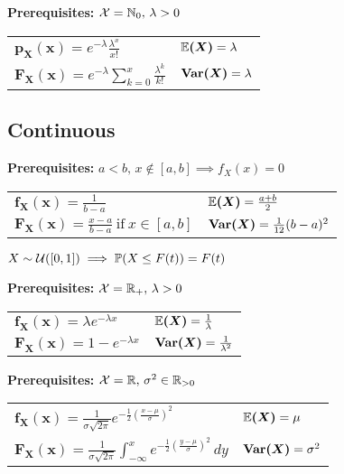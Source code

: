 \begin{ddefinition*}
  \textbf{Prerequisites:} \(\operatorname{\mathcal{X}} = \mathbb{N}_0, \, \lambda > 0\) \\
  \begin{tabularx}{\linewidth}{@{}ll@{}}
    \(\bm{p_X(x)} = e^{-\lambda}\frac{\lambda^x}{x!}\) & \(\bm{\mathbb{E}(X)} = \lambda\) \\
    \(\bm{F_X(x)} = e^{-\lambda} \sum\limits_{k=0}^x \frac{\lambda^k}{k!}\) & \(\bm{\Var(X)} = \lambda\)
  \end{tabularx}
\end{ddefinition*}

\pagebreak
\subsection*{Continuous}
\begin{cdefinition*}
  \textbf{Prerequisites:} \(a < b, \, x \notin [a, b] \implies f_X(x) = 0\) \\
  \begin{tabularx}{\linewidth}{@{}ll@{}}
    \(\bm{f_X(x)} = \frac{1}{b-a}\) & \(\bm{\mathbb{E}(X)} = \frac{a + b}{2}\) \\
    \(\bm{F_X(x)} = \frac{x - a}{b - a} \ \text{if} \ x \in [a, b]\) & \(\bm{\Var(X)} = \frac{1}{12}(b - a)^2\)
  \end{tabularx}
\end{cdefinition*}

\begin{lemma}
  \(X \sim \operatorname{\mathcal{U}}([0, 1]) \implies \mathbb{P}(X \leq F(t)) = F(t)\)
\end{lemma}

\begin{cdefinition*}
  \textbf{Prerequisites:} \(\operatorname{\mathcal{X}} = \mathbb{R}_+, \, \lambda > 0\) \\
  \begin{tabularx}{\linewidth}{@{}ll@{}}
    \(\bm{f_X(x)} = \lambda e^{-\lambda x}\) & \(\bm{\mathbb{E}(X)} = \frac{1}{\lambda}\) \\
    \(\bm{F_X(x)} = 1 - e^{-\lambda x}\) & \(\bm{\Var(X)} = \frac{1}{\lambda^2}\)
  \end{tabularx}
\end{cdefinition*}

\begin{cdefinition*}
  \textbf{Prerequisites:} \(\operatorname{\mathcal{X}} = \mathbb{R}, \, \sigma^2 \in \mathbb{R}_{>0}\) \\
  \begin{tabularx}{\linewidth}{@{}ll@{}}
    \(\bm{f_X(x)} = \frac{1}{\sigma\sqrt{2 \pi}}e^{-\frac{1}{2}\left(\frac{x - \mu}{\sigma}\right)^2}\) & \(\bm{\mathbb{E}(X)} = \mu\) \\
    \(\bm{F_X(x)} = \frac{1}{\sigma\sqrt{2 \pi}}\int_{-\infty}^xe^{-\frac{1}{2}\left(\frac{y - \mu}{\sigma}\right)^2} \, dy\) & \(\bm{\Var(X)} = \sigma^2\)
  \end{tabularx}
\end{cdefinition*}

